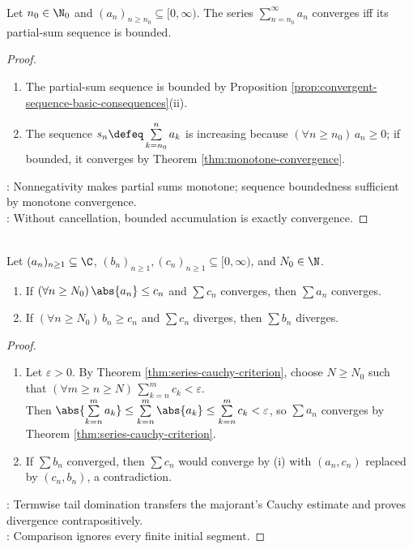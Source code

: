 \begin{theorem} \label{thm:nonnegative-series-bounded-partial-sums} \\
Let $n_0\in\N_0$ and $(a_n)_{n\geq n_0}\subseteq[0,\infty)$. The series $\sum\limits_{n=n_0}^{\infty}a_n$ converges iff its partial-sum sequence is bounded.
\begin{proof}
\begin{enumerate}[label=\roman*.]
\setlength{\itemsep}{0pt}
\item[$(\Rightarrow)$] The partial-sum sequence is bounded by Proposition \ref{prop:convergent-sequence-basic-consequences}(ii).
\item[$(\Leftarrow)$] The sequence $s_n\defeq\sum\limits_{k=n_0}^{n}a_k$ is increasing because $(\forall n\geq n_0)\,a_n\geq0$; if bounded, it converges by Theorem \ref{thm:monotone-convergence}.
\end{enumerate}
: Nonnegativity makes partial sums monotone; sequence boundedness sufficient by monotone convergence.\\
: Without cancellation, bounded accumulation is exactly convergence.
\end{proof}
\end{theorem}

\begin{theorem} \label{thm:series-comparison-test} \\
Let $(a_n)_{n\geq1}\subseteq\C$, $(b_n)_{n\geq1},(c_n)_{n\geq1}\subseteq[0,\infty)$, and $N_0\in\N$.
\begin{enumerate}[label=(\roman*)]
\setlength{\itemsep}{0pt}
\item If $(\forall n\geq N_0)\,\abs{a_n}\leq c_n$ and $\sum c_n$ converges, then $\sum a_n$ converges.
\item If $(\forall n\geq N_0)\,b_n\geq c_n$ and $\sum c_n$ diverges, then $\sum b_n$ diverges.
\end{enumerate}
\begin{proof}
\begin{enumerate}[label=(\roman*)]
\setlength{\itemsep}{0pt}
\item Let $\varepsilon>0$. By Theorem \ref{thm:series-cauchy-criterion}, choose $N\geq N_0$ such that $(\forall m\geq n\geq N)\,\sum\limits_{k=n}^{m}c_k<\varepsilon$.\\
Then $\abs{\sum\limits_{k=n}^{m}a_k}\leq\sum\limits_{k=n}^{m}\abs{a_k}\leq\sum\limits_{k=n}^{m}c_k<\varepsilon$, so $\sum a_n$ converges by Theorem \ref{thm:series-cauchy-criterion}.
\item If $\sum b_n$ converged, then $\sum c_n$ would converge by (i) with $(a_n,c_n)$ replaced by $(c_n,b_n)$, a contradiction.
\end{enumerate}
: Termwise tail domination transfers the majorant's Cauchy estimate and proves divergence contrapositively.\\
: Comparison ignores every finite initial segment.
\end{proof}
\end{theorem}

